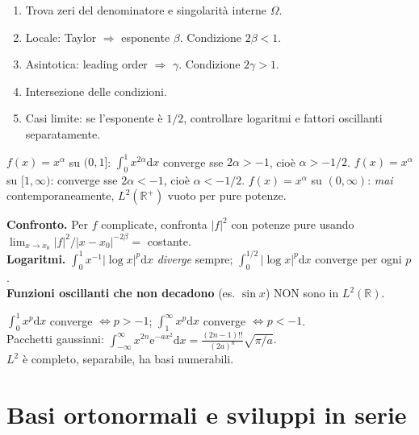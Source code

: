 \documentclass[11pt,a4paper,openany]{book}
\theoremstyle{definition}
\newcommand{\R}{\mathbb{R}}
\newcommand{\dd}{\mathrm{d}}
\newcommand{\eu}{\mathrm{e}}
\begin{document}
\begin{algoritmo}
\begin{enumerate}
\item Trova zeri del denominatore e singolarit\`a interne $\Omega$.
\item Locale: Taylor $\Rightarrow$ esponente $\beta$. Condizione $2\beta<1$.
\item Asintotica: leading order $\Rightarrow$ $\gamma$. Condizione $2\gamma>1$.
\item Intersezione delle condizioni.
\item Casi limite: se l'esponente \`e $1/2$, controllare logaritmi e fattori oscillanti separatamente.
\end{enumerate}
\end{algoritmo}

\begin{esempio}
$f(x)=x^\alpha$ su $(0,1]$: $\int_0^1 x^{2\alpha}\dd x$ converge sse $2\alpha>-1$, cio\`e $\alpha>-1/2$.
$f(x)=x^\alpha$ su $[1,\infty)$: converge sse $2\alpha<-1$, cio\`e $\alpha<-1/2$.
$f(x)=x^\alpha$ su $(0,\infty)$: \emph{mai} contemporaneamente, $L^2(\R^+)$ vuoto per pure potenze.
\end{esempio}

\begin{trucco}
\textbf{Confronto.} Per $f$ complicate, confronta $|f|^2$ con potenze pure usando $\lim_{x\to x_0}|f|^2/|x-x_0|^{-2\beta}=$ costante.\\
\textbf{Logaritmi.} $\int_0^1 x^{-1}|\log x|^p\dd x$ \emph{diverge} sempre; $\int_0^{1/2}|\log x|^p\dd x$ converge per ogni $p$.\\
\textbf{Funzioni oscillanti che non decadono} (es. $\sin x$) NON sono in $L^2(\R)$.
\end{trucco}

\begin{formulario}
$\int_0^1 x^p\dd x$ converge $\iff p>-1$; $\int_1^\infty x^p\dd x$ converge $\iff p<-1$.
\\Pacchetti gaussiani: $\int_{-\infty}^\infty x^{2n}\eu^{-ax^2}\dd x=\frac{(2n-1)!!}{(2a)^n}\sqrt{\pi/a}$.
\\$L^2$ \`e completo, separabile, ha basi numerabili.
\end{formulario}

\chapter{Basi ortonormali e sviluppi in serie}
\end{document}
